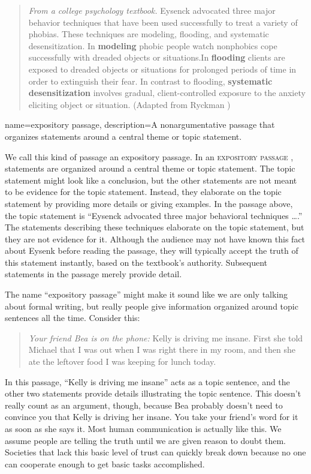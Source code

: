 \begin{quotation}\noindent\textit{From a college psychology textbook.} Eysenck advocated three major behavior techniques that have been used successfully to treat a variety of phobias. These techniques are modeling, flooding, and systematic desensitization. In \textbf{modeling} phobic people watch nonphobics cope successfully with dreaded objects or situations.In \textbf{flooding} clients are exposed to dreaded objects or situations for prolonged periods of time in order to extinguish their fear. In contrast to flooding, \textbf{systematic desensitization} involves gradual, client-controlled exposure to the anxiety eliciting object or situation. (Adapted from Ryckman \citeyear{Ryckman2007}) \end{quotation}

{
name=expository passage,
description={A nonargumentative passage that organizes statements around a central theme or topic statement.}
}

We call this kind of passage an expository passage. In an \textsc{\gls{expository passage}} \label{def:expository_passage}, statements are organized around a central theme or topic statement. The topic statement might look like a conclusion, but the other statements are not meant to be evidence for the topic statement. Instead, they elaborate on the topic statement by providing more details or giving examples. In the passage above, the topic statement is ``Eysenck advocated three major behavioral techniques \ldots.'' The statements describing these techniques elaborate on the topic statement, but they are not evidence for it. Although the audience may not have known this fact about Eysenk before reading the passage, they will typically accept the truth of this statement instantly, based on the textbook's authority. Subsequent statements in the passage merely provide detail. 

The name ``expository passage'' might make it sound like we are only talking about formal writing, but really people give information organized around topic sentences all the time. Consider this:
\begin{quote}      
\emph{Your friend Bea is on the phone:} Kelly is driving me insane. First she told Michael that I was out when I was right there in my room, and then she ate the leftover food I was keeping for lunch today.
\end{quote}
In this passage, ``Kelly is driving me insane'' acts as a topic sentence, and the other two statements provide details illustrating the topic sentence. This doesn't really count as an argument, though, because Bea probably doesn't need to convince you that Kelly is driving her insane. You take your friend's word for it as soon as she says it. Most human communication is actually like this. We assume people are telling the truth until we are given reason to doubt them. Societies that lack this basic level of trust can quickly break down because no one can cooperate enough to get basic tasks accomplished.  
      
